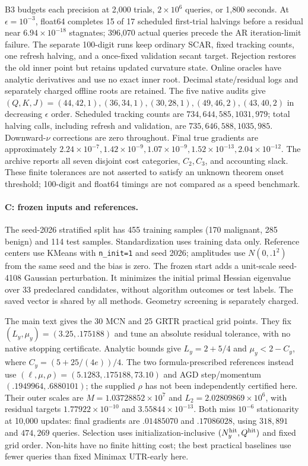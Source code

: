 B3 budgets each precision at 2,000 trials, $2\times10^6$ queries, or
1,800 seconds. At $\epsilon=10^{-3}$, float64 completes 15 of 17
scheduled first-trial halvings before a residual near $6.94\times10^{-18}$
stagnates; 396,070 actual queries precede the AR iteration-limit failure.
The separate 100-digit runs keep ordinary SCAR, fixed tracking counts,
one refresh halving, and a once-fixed validation secant target. Rejection
restores the old inner point but retains updated curvature state. Online
oracles have analytic derivatives and use no exact inner root. Decimal
state/residual logs and separately charged offline roots are retained.
The five native audits give $(Q,K,J)=(44,42,1),(36,34,1),(30,28,1),
(49,46,2),(43,40,2)$ in decreasing $\epsilon$ order. Scheduled tracking
counts are $734,644,585,1031,979$; total halving calls, including refresh
and validation, are $735,646,588,1035,985$. Downward-$\nu$ corrections
are zero throughout. Final true gradients are approximately
$2.24\times10^{-7},1.42\times10^{-9},1.07\times10^{-9},
1.52\times10^{-13},2.04\times10^{-12}$.
The archive reports all seven disjoint cost categories, $C_2,C_3$, and
accounting slack. These finite tolerances are not asserted to satisfy an
unknown theorem onset threshold; 100-digit and float64 timings are not
compared as a speed benchmark.

\paragraph{C: frozen inputs and references.}
\label{app:exp-c}
\label{app:exp-c-initialization}
The seed-2026 stratified split has 455 training samples (170 malignant,
285 benign) and 114 test samples. Standardization uses training data
only. Reference centers use KMeans with \texttt{n\_init=1} and seed 2026;
amplitudes use $N(0,.1^2)$ from the same seed and the bias is zero.
The frozen start adds a unit-scale seed-4108 Gaussian perturbation.
It minimizes the initial primal Hessian eigenvalue over 33 predeclared
candidates, without algorithm outcomes or test labels. The saved vector
is shared by all methods. Geometry screening is separately charged.

\label{app:exp-c-reference}
\label{app:exp-c-grids}
The main text gives the 30 MCN and 25 GRTR practical grid points.
They fix $(L_y,\mu_y)=(3.25,.175188)$ and tune an absolute residual
tolerance, with no native stopping certificate. Analytic bounds give
$L_y=2+5/4$ and $\mu_y<2-C_y$, where $C_y=(5+25/(4e))/4$.
The two formula-prescribed
references instead use $(\ell,\mu,\rho)=(5.1283,.175188,73.10)$ and
AGD step/momentum $(.1949964,.6880101)$; the supplied $\rho$ has not
been independently certified here. Their outer scales are
$M=1.03728852\times10^7$ and $L_2=2.02809869\times10^6$, with residual
targets $1.77922\times10^{-10}$ and $3.55844\times10^{-13}$.
Both miss $10^{-6}$ stationarity at 10,000 updates: final gradients are
$.01485070$ and $.17086028$, using $318{,}891$ and $474{,}269$ queries.
Selection uses initialization-inclusive $(N_y^{\rm hit},Q^{\rm hit})$
and fixed grid order. Non-hits have no finite hitting cost; the best
practical baselines use fewer queries than fixed Minimax UTR-early here.

